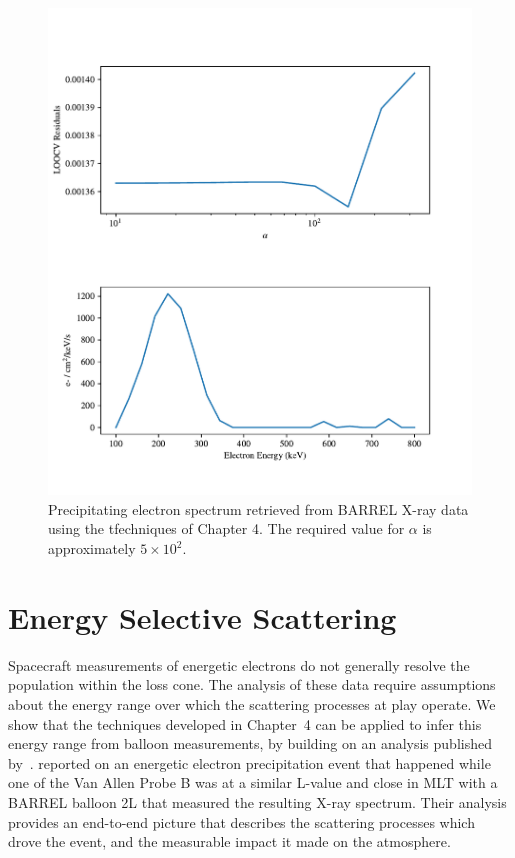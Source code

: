 \begin{figure}[p]
    \centering
    \includegraphics[width=1.0\textwidth]{figures/chapter_5/barrel_tk_inv/barrel_tk_inv}
    \caption{Precipitating electron spectrum retrieved from BARREL X-ray data using the tfechniques of Chapter 4. The required value for $\alpha$ is approximately $5\times10^2$.}
    \label{barrel_tk_inv}
\end{figure}

\section{Energy Selective Scattering}

Spacecraft measurements of energetic electrons do not generally resolve the population within the loss cone. The analysis of these data require assumptions about the energy range over which the scattering processes at play operate. We show that the techniques developed in Chapter~4 can be applied to infer this energy range from balloon measurements, by building on an analysis published by~\citet{Halford2015}. \cite{Halford2015} reported on an energetic electron precipitation event that happened while one of the Van Allen Probe B was at a similar L-value and close in MLT with a BARREL balloon 2L that measured the resulting X-ray spectrum. Their analysis provides an end-to-end picture that describes the scattering processes which drove the event, and the measurable impact it made on the atmosphere.  

